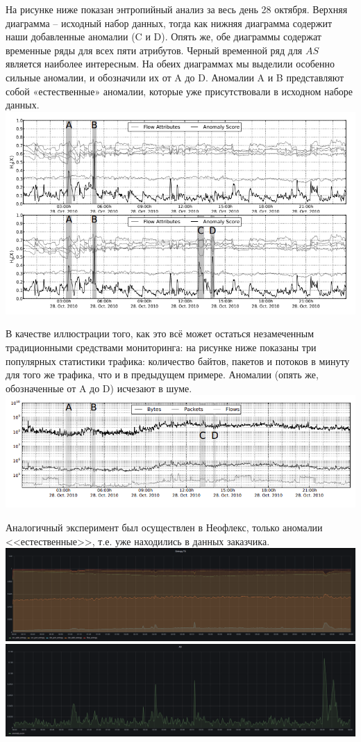 \documentclass[]{interact}
\theoremstyle{plain}%
\theoremstyle{definition}
\theoremstyle{remark}
\begin{document}
На рисунке ниже показан энтропийный анализ за весь день 28 октября. Верхняя диаграмма -- исходный набор данных, тогда как нижняя диаграмма содержит наши добавленные аномалии (C и D). Опять же, обе диаграммы содержат временные ряды для всех пяти атрибутов. Черный временной ряд для $AS$ является наиболее интересным. На обеих диаграммах мы выделили особенно сильные аномалии, и обозначили их от A до D. Аномалии A и B представляют собой «естественные» аномалии, которые уже присутствовали в исходном наборе данных.
\includegraphics[scale=0.5]{./img1.png}

В качестве иллюстрации того, как это всё может остаться незамеченным традиционными средствами мониторинга: на рисунке ниже показаны три популярных
статистики трафика: количество байтов, пакетов и потоков в минуту для того же трафика, что и в предыдущем примере. Аномалии (опять же, обозначенные от A до D) исчезают в шуме.
\includegraphics[scale=0.5]{./img3.png}

Аналогичный эксперимент был осуществлен в Неофлекс, только аномалии <<естественные>>, т.е. уже находились в данных заказчика.
\includegraphics[scale=0.2]{./img2.png}
\includegraphics[scale=0.2]{./img4.png}
\end{document}
